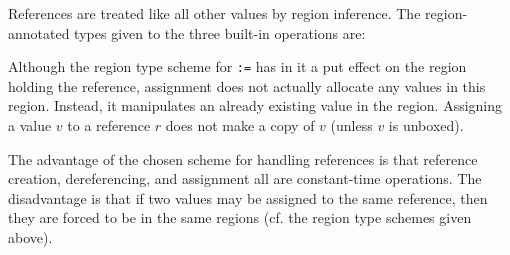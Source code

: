 \documentclass[12pt]{book}
\begin{document}
References are treated like all other values by region inference.
The region-annotated types given to the three built-in operations
are:
\medskip

\medskip

\noindent
Although the region type scheme for \verb+:=+ has in it a put effect
on the region holding the reference, assignment does not actually
allocate any values in this region. Instead, it manipulates an already
existing value in the region. Assigning a value $v$ to a reference $r$
does not make a copy of $v$ (unless $v$ is unboxed).

The advantage of the chosen scheme for handling references is that
reference creation, dereferencing, and assignment all are constant-time
operations. The disadvantage is that if two values may be
assigned to the same reference, then they are forced to be in the same regions (cf. the
region type schemes given above). 
\end{document}
